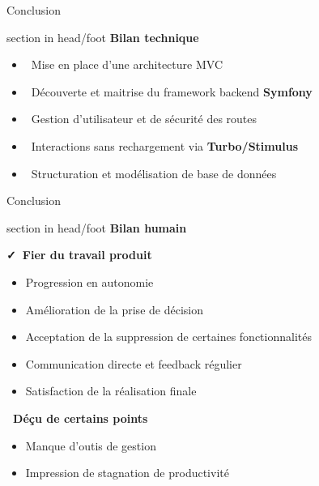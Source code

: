\documentclass{beamer}
\begin{document}
\begin{frame}{Conclusion}
  	\begin{beamercolorbox}[wd=\paperwidth,ht=1.5em,dp=0.5em,leftskip=0.5cm]{section in head/foot}
  		\large \textbf{Bilan technique}
	\end{beamercolorbox}
	\vspace{0.5em}
	\begin{center}
  		\begin{minipage}{0.9\textwidth}
  			\begin{itemize}
  				\item \faLaptopCode\ Mise en place d'une architecture MVC
  				\item \faCodeBranch\ Découverte et maitrise du framework backend \textbf{Symfony}
  				\item \faLock\ Gestion d'utilisateur et de sécurité des routes
  				\item \faBolt\ Interactions sans rechargement via \textbf{Turbo/Stimulus}
  				\item \faDatabase\ Structuration et modélisation de base de données
			\end{itemize}
  		\end{minipage}
	\end{center}
	\vfill
\end{frame}

\begin{frame}{Conclusion}
  	\begin{beamercolorbox}[wd=\paperwidth,ht=1.5em,dp=0.5em,leftskip=0.5cm]{section in head/foot}
  		\large \textbf{Bilan humain}
	\end{beamercolorbox}
	\vspace{0.5em}
	\begin{center}
  		\begin{minipage}{1\textwidth}
  			\textbf{\faCheck\ Fier du travail produit}
  			\begin{itemize}
  				\item Progression en autonomie
  				\item Amélioration de la prise de décision
  				\item Acceptation de la suppression de certaines fonctionnalités
  				\item Communication directe et feedback régulier
  				\item Satisfaction de la réalisation finale
  			\end{itemize}
  				
  			\textbf{\faTimes\ Déçu de certains points}
  			\begin{itemize}
  				\item Manque d'outis de gestion
		  		\item Impression de stagnation de productivité
  			\end{itemize}
  		\end{minipage}
	\end{center}
	\vfill
\end{frame}
\end{document}

